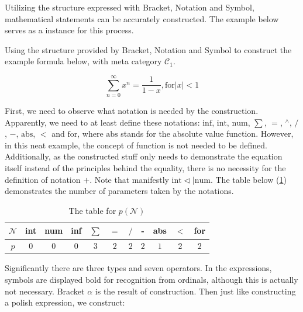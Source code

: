 \documentclass{aims}
\numberwithin{equation}{section}
\numberwithin{theorem}{section}	%
\numberwithin{axiom}{section}	%
\numberwithin{definition}{section}	%
\begin{document}
	Utilizing the structure expressed with Bracket, Notation and Symbol, mathematical statements can be accurately constructed. The example below serves as a instance for this process.
	
	Using the structure provided by Bracket, Notation and Symbol to construct the example formula below, with meta category \(\mathcal{C}_1\).
	
	\begin{equation*}
		\sum _{n=0}^{\infty } x^n=\frac{1}{1-x}, \text{for} |x|<1
	\end{equation*}
	
	First, we need to observe what notation is needed by the construction. Apparently, we need to at least define these notations: \(\text{inf}\), \(\text{int}\), \(\text{num}\),\textit{  }\textit{ \(\sum\)}, \(=\), \({}^{\wedge}\), \(/\), \(-\), \(\text{abs}\), \(<\) and \(\text{for}\), where \(\text{abs}\) stands for the absolute value function. However, in this neat example, the concept of function is not needed to be defined. Additionally, as the constructed stuff only needs to demonstrate the equation itself instead of the principles behind the equality, there is no necessity for the definition of notation \(+\). Note that manifestly \(\text{int} \triangleleft | \text{num}\). The table below (\ref{table-1}) demonstrates the number of parameters taken by the notations.
	
	\begin{table}[h]
		\centering
		\caption{The table for $\mathit{p}(\mathcal{N})$}
		\begin{tabular}{ccccccccccc}
			\toprule
			$\mathcal{N}$ & int & num & inf & $\sum$ & $=$ & $/$ & - & abs & $<$ & for \\
			\midrule
			$\mathit{p}$ & $0$ & $0$ & $0$ & $3$ & $2$ & $2$ & $2$ & $1$ & $2$ & $2$ \\
			\bottomrule
		\end{tabular}
		\label{table-1}
	\end{table}
	
	Significantly there are three types and seven operators. In the expressions, symbols are displayed bold for recognition from ordinals, although this
	is actually not necessary. Bracket \(\alpha\) is the result of construction. Then just like constructing a polish expression, we construct:
	
\end{document}
